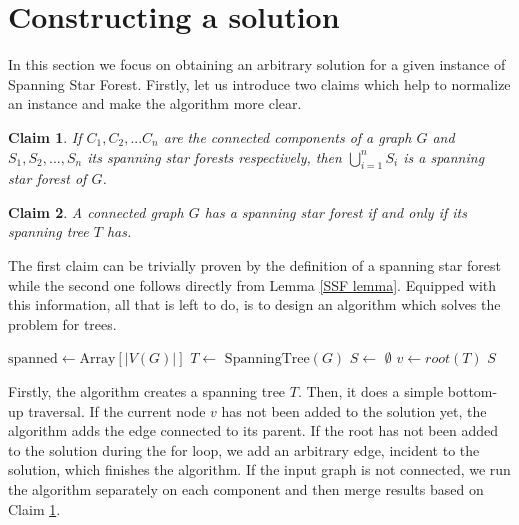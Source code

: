\documentclass[en]{pracamgr}
\newtheorem{claim}{Claim}
\newcommand{\ssf}{spanning star forest}
\newcommand{\ssfp}{{\sc Spanning Star Forest}}
\begin{document}
\section{Constructing a solution}

In this section we focus on obtaining an arbitrary solution for a given instance of \ssfp{}. Firstly, let us introduce two claims which help to normalize an instance and make the algorithm more clear.

\begin{claim} \label{SSF sum}
	If $C_1,C_2,...C_n$ are the connected components of a graph $G$ and $S_1,S_2,...,S_n$ its \ssf{}s respectively, then $\bigcup\limits_{i=1}^n S_i$ is a \ssf{} of $G$.
\end{claim}

\begin{claim} \label{Spanning tree SSF}
	A connected graph $G$ has a \ssf{} if and only if its spanning tree $T$ has.
\end{claim}

The first claim can be trivially proven by the definition of a \ssf{} while the second one follows directly from Lemma \ref{SSF lemma}. Equipped with this information, all that is left to do, is to design an algorithm which solves the problem for trees.

\begin{algorithm}\label{alg1}
	\KwOut{\ssf{} of $G$}
	$\textrm{spanned} \leftarrow \textrm{Array}[|V(G)|]$\; 
	$T \leftarrow$ $\textrm{SpanningTree}(G)$\;
	$S \leftarrow$ $\emptyset$\;
	$v \leftarrow root(T)$\;
	\Return $S$\;
	\caption{Obtaining a spanning star forest from a connected graph.}
\end{algorithm}

Firstly, the algorithm creates a spanning tree $T$. Then, it does a simple bottom-up traversal. If the current node $v$ has not been added to the solution yet, the algorithm adds the edge connected to its parent. If the root has not been added to the solution during the for loop, we add an arbitrary edge, incident to the solution, which finishes the algorithm. If the input graph is not connected, we run the algorithm separately on each component and then merge results based on Claim \ref{SSF sum}.
\end{document}
